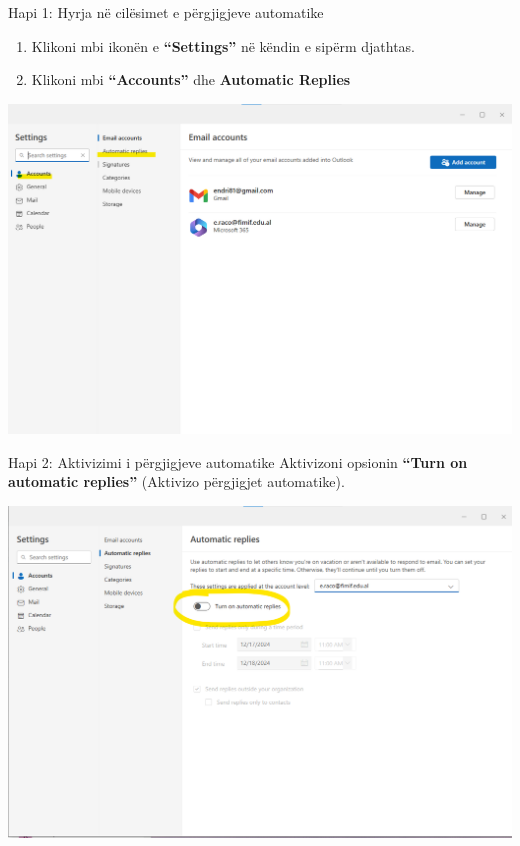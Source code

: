 \documentclass[
  ignorenonframetext,
]{beamer}
\begin{document}
\begin{frame}{Hapi 1: Hyrja në cilësimet e përgjigjeve automatike}
\label{hapi-1-hyrja-nuxeb-ciluxebsimet-e-puxebrgjigjeve-automatike}
\begin{enumerate}
\item
  Klikoni mbi ikonën e \textbf{``Settings''} në këndin e sipërm
  djathtas.
\item
  Klikoni mbi \textbf{``Accounts''} dhe \textbf{Automatic Replies}
\end{enumerate}

\includegraphics{./images/outlook34.png}
\end{frame}

\begin{frame}{Hapi 2: Aktivizimi i përgjigjeve automatike}
\label{hapi-2-aktivizimi-i-puxebrgjigjeve-automatike}
Aktivizoni opsionin \textbf{``Turn on automatic replies''} (Aktivizo
përgjigjet automatike).

\includegraphics{./images/outlook35.png}
\end{frame}
\end{document}
